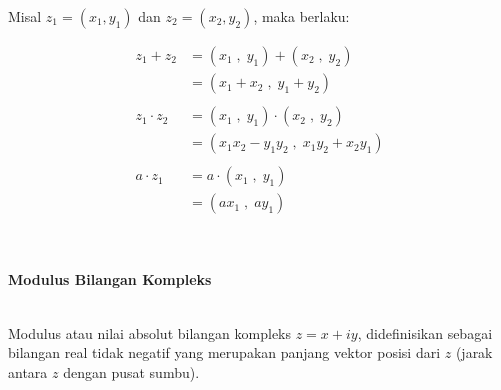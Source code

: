 \documentclass{article}
\begin{document}
    Misal $ z_1 = ( x_1 , y_1 )  $ dan $ z_2 = ( x_2 , y_2 ) $, maka berlaku:

    \begin{align}
            z_1 + z_2   & = ( x_1 \;,\; y_1 ) + ( x_2 \;,\; y_2 )
            \nonumber\\
            & = ( x_1 + x_2 \;,\; y_1 + y_2 )
            \\\nonumber\\
            z_1 \cdot z_2   & = ( x_1 \;,\; y_1 ) \cdot ( x_2 \;,\; y_2 )
                            \nonumber\\
                            & = ( x_1 x_2 - y_1 y_2 \;,\; x_1 y_2 + x_2 y_1 )
                            \\\nonumber\\
            a \cdot z_1 & = a \cdot ( x_1 \;,\; y_1 )
                        \nonumber\\
                        & = ( ax_1 \;,\; ay_1 )
    \end{align}
    \\ \\

    \newpage
    \begin{center}
        \textbf{Modulus Bilangan Kompleks}
    \end{center}
    \leavevmode\\

    Modulus atau nilai absolut bilangan kompleks $ z = x + iy $, didefinisikan sebagai bilangan real tidak negatif yang merupakan panjang vektor posisi dari $z$ (jarak antara $z$ dengan pusat sumbu).
    \\ \\

    \\ \\
\end{document}
